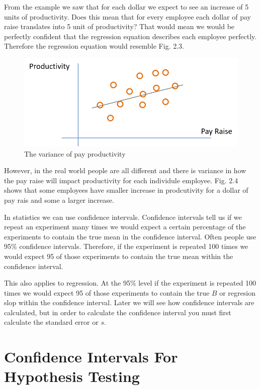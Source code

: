 \documentclass[]{book}
\theoremstyle{definition}
\theoremstyle{definition}
\theoremstyle{definition}
\theoremstyle{remark}
\begin{document}
From the example we saw that for each dollar we expect to see an
increase of 5 units of productivity. Does this mean that for every
employee each dollar of pay raise translates into 5 unit of
productivity? That would mean we would be perfectly confident that the
regression equation describes each employee perfectly. Therefore the
regression equation would resemble Fig. 2.3.

\begin{figure}

{\centering \includegraphics[width=0.328\linewidth]{figures/Pay_Productivity_With_Variance} 

}

\caption{The variance of pay productivity}\label{fig:pay-variance}
\end{figure}

However, in the real world people are all different and there is
variance in how the pay raise will impact productivity for each
individule employee. Fig. 2.4 shows that some employees have smaller
increase in prodcutivity for a dollar of pay rais and some a larger
increase.

In statistics we can use confidence intervals. Confidence intervals tell
us if we repeat an experiment many times we would expect a certain
percentage of the experiments to contain the true mean in the confidence
interval. Often people use 95\% confidence intervals. Therefore, if the
experiment is repeated 100 times we would expect 95 of those experiments
to contain the true mean within the confidence interval.

This also applies to regression. At the 95\% level if the experiment is
repeated 100 times we would expect 95 of those experiments to contain
the true \(B\) or regresion slop within the confidence interval. Later
we will see how confidence intervals are calculated, but in order to
calculate the confidence interval you must first calculate the standard
error or \(s\).

\hypertarget{confidence-intervals-for-hypothesis-testing}{%
\section{Confidence Intervals For Hypothesis
Testing}\label{confidence-intervals-for-hypothesis-testing}}
\end{document}
